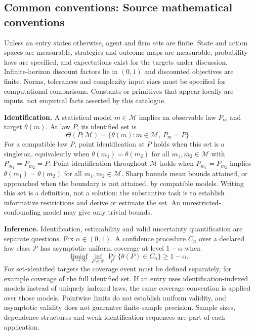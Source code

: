 \documentclass[11pt,a4paper]{article}
\begin{document}
\subsection*{Common conventions: Source mathematical conventions}

Unless an entry states otherwise, agent and firm sets are finite. State and action spaces are measurable, strategies and outcome maps are measurable, probability laws are specified, and expectations exist for the targets under discussion. Infinite-horizon discount factors lie in $(0,1)$ and discounted objectives are finite. Norms, tolerances and complexity input sizes must be specified for computational comparisons. Constants or primitives that appear locally are inputs, not empirical facts asserted by this catalogue.

\textbf{Identification.} A statistical model $m\in\mathcal M$ implies an observable law $P_m$ and target $\theta(m)$. At law $P$, its identified set is
\[
\Theta(P;\mathcal M)=\{\theta(m):m\in\mathcal M,\ P_m=P\}.
\]
For a compatible law $P$, point identification at $P$ holds when this set is a singleton, equivalently when $\theta(m_1)=\theta(m_2)$ for all $m_1,m_2\in\mathcal M$ with $P_{m_1}=P_{m_2}=P$. Point identification throughout $\mathcal M$ holds when $P_{m_1}=P_{m_2}$ implies $\theta(m_1)=\theta(m_2)$ for all $m_1,m_2\in\mathcal M$. Sharp bounds mean bounds attained, or approached when the boundary is not attained, by compatible models. Writing this set is a definition, not a solution: the substantive task is to establish informative restrictions and derive or estimate the set. An unrestricted-confounding model may give only trivial bounds.

\textbf{Inference.} Identification, estimability and valid uncertainty quantification are separate questions. Fix $\alpha\in(0,1)$. A confidence procedure $C_n$ over a declared law class $\mathcal P$ has asymptotic uniform coverage at level $1-\alpha$ when
\[
\liminf_{n\to\infty}\inf_{P\in\mathcal P}\Pr_P\{\theta(P)\in C_n\}\geq1-\alpha.
\]
For set-identified targets the coverage event must be defined separately, for example coverage of the full identified set. If an entry uses identification-indexed models instead of uniquely indexed laws, the same coverage convention is applied over those models. Pointwise limits do not establish uniform validity, and asymptotic validity does not guarantee finite-sample precision. Sample sizes, dependence structures and weak-identification sequences are part of each application.
\end{document}
